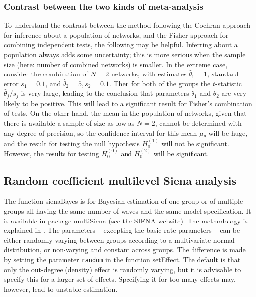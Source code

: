 \documentclass[a4paper,fleqn,11pt]{article}
\newcommand{\+}{\, + \,}
\newcommand{\sfn}[1]{\textsf{#1}}
\newcommand{\SI}{{\sf SIENA }}
\newcommand{\MS}{{\sf multiSiena }}
\begin{document}
\subsubsection{Contrast between the two kinds of meta-analysis }

To understand the contrast between the method following the Cochran approach
for inference about a population of networks,
and the Fisher approach for combining independent tests, the following
may be helpful.
Inferring about a population always adds some uncertainty;
this is more serious when the sample size (here: number of combined networks)
is smaller.
In the extreme case, consider the combination of $N=2$ networks,
with estimates $\hat\theta_1 = 1$, standard error $s_1 = 0.1$,
and $\hat\theta_2 = 5, s_2 = 0.1$.
Then for both of the groups the $t$-statistic $\hat\theta_j/s_j$ is very large,
leading to the conclusion that parameters $\theta_1$ and $\theta_2$
are very likely to be positive.
This will lead to a significant result for Fisher's combination of tests.
On the other hand, the mean in the population of networks, given that
there is available a sample of size as low as $N=2$, cannot be determined with
any degree of precision, so the confidence interval for this mean $\mu_\theta$
will be huge, and the result for testing the null hypothesis
$H_0^{(1)}$ will not be significant.
However, the results for testing $H_0^{(0)}$ and $H_0^{(2)}$
will be significant.


\subsection{Random coefficient multilevel Siena analysis}
\label{S_sienaBayes}

  The function \sfn{sienaBayes} is for Bayesian estimation of one group or
  of multiple groups all having the same number of waves and the same
  model specification.
  It is available in package \MS (see the \SI website).
  The methodology is explained in \citet{KoskinenSnijders2022}.
  The parameters -- excepting the basic rate parameters -- can be either
  randomly varying between groups according to a multivariate
  normal distribution, or non-varying and constant across groups.
  The difference is made by setting the parameter \texttt{random} in
  the function \sfn{setEffect}. The default is that only the out-degree (density)
  effect is randomly varying, but it is advisable to specify
  this for a larger set of effects.
  Specifying it for too many effects may, however, lead to unstable estimation.
\end{document}
